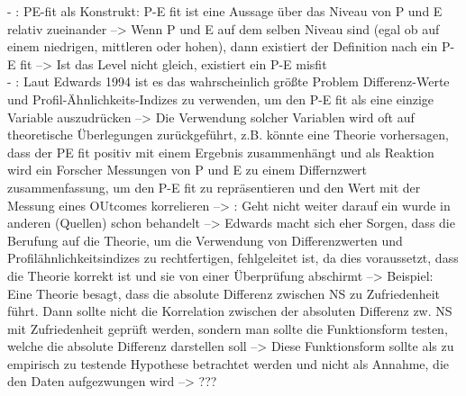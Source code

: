 - \cite[S. 53]{edwards:2008}: PE-fit als Konstrukt: P-E fit ist eine Aussage über das Niveau von P und E relativ zueinander --> Wenn P und E auf dem selben Niveau sind (egal ob auf einem niedrigen, mittleren oder hohen), dann existiert der Definition nach ein P-E fit --> Ist das Level nicht gleich, existiert ein P-E misfit \\
- \cite[S. 55]{edwards:2008}: Laut Edwards 1994 ist es das wahrscheinlich größte Problem Differenz-Werte und Profil-Ähnlichkeits-Indizes zu verwenden, um den P-E fit als eine einzige Variable auszudrücken --> Die Verwendung solcher Variablen wird oft auf theoretische Überlegungen zurückgeführt, z.B. könnte eine Theorie vorhersagen, dass der PE fit positiv mit einem Ergebnis zusammenhängt und als Reaktion wird ein Forscher Messungen von P und E zu einem Differnzwert zusammenfassung, um den P-E fit zu repräsentieren und den Wert mit der Messung eines OUtcomes korrelieren --> \cite[S. 56]{edwards:2008}: Geht nicht weiter darauf ein wurde in anderen (Quellen) schon behandelt --> Edwards macht sich eher Sorgen, dass die Berufung auf die Theorie, um die Verwendung von Differenzwerten und Profilähnlichkeitsindizes zu rechtfertigen, fehlgeleitet ist, da dies voraussetzt, dass die Theorie korrekt ist und sie von einer Überprüfung abschirmt --> Beispiel: Eine Theorie besagt, dass die absolute Differenz zwischen NS zu Zufriedenheit führt. Dann sollte nicht die Korrelation zwischen der absoluten Differenz zw. NS mit Zufriedenheit geprüft werden, sondern man sollte die Funktionsform testen, welche die absolute Differenz darstellen soll --> Diese Funktionsform sollte als zu empirisch zu testende Hypothese betrachtet werden und nicht als Annahme, die den Daten aufgezwungen wird --> ???

